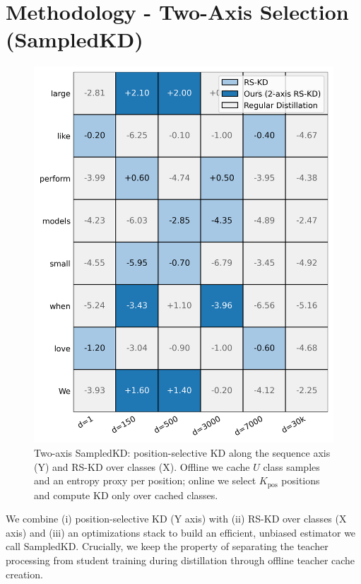 \documentclass[11pt]{article}
\begin{document}
\section{Methodology - Two-Axis Selection (SampledKD)}
\label{sec:twoaxis}
\begin{figure}[t]
	\centering
	\includegraphics[width=\linewidth]{rskd_grid_two_axis_blue.png}
	\caption{Two-axis SampledKD: position-selective KD along the sequence axis (Y) and RS-KD over classes (X). Offline we cache $U$ class samples and an entropy proxy per position; online we select $K_{\text{pos}}$ positions and compute KD only over cached classes.}
	\label{fig:two-axis}
\end{figure}

\FloatBarrier

We combine (i) position-selective KD (Y axis) with (ii) RS-KD over classes (X axis) and (iii) an optimizations stack to build an efficient, unbiased estimator we call SampledKD.
Crucially, we keep the property of separating the teacher processing from student training during distillation through offline teacher cache creation.
\end{document}
